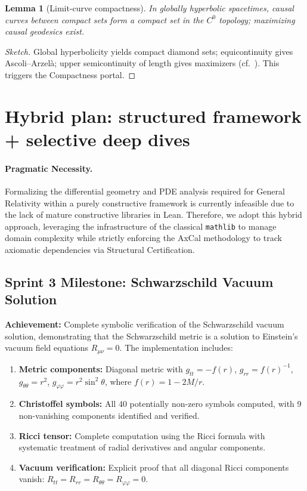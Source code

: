 \documentclass[11pt]{article}
\newtheorem{lemma}[theorem]{Lemma}
\theoremstyle{definition}
\theoremstyle{remark}
\begin{document}
\begin{lemma}[Limit-curve compactness]\label{lem:limitcurve}
In globally hyperbolic spacetimes, causal curves between compact sets form a compact set in the $C^0$ topology; maximizing causal geodesics exist.
\end{lemma}
\begin{proof}[Sketch]
Global hyperbolicity yields compact diamond sets; equicontinuity gives Ascoli--Arzelà; upper semicontinuity of length gives maximizers (cf.\ \cite[§14]{Wald1984}). This triggers the Compactness portal.
\end{proof}

\section{Hybrid plan: structured framework + selective deep dives}

\paragraph{Pragmatic Necessity.} Formalizing the differential geometry and PDE analysis required for General Relativity within a purely constructive framework is currently infeasible due to the lack of mature constructive libraries in Lean. Therefore, we adopt this hybrid approach, leveraging the infrastructure of the classical \texttt{mathlib} to manage domain complexity while strictly enforcing the AxCal methodology to track axiomatic dependencies via Structural Certification.

\subsection{Sprint 3 Milestone: Schwarzschild Vacuum Solution}
\textbf{Achievement:} Complete symbolic verification of the Schwarzschild vacuum solution, demonstrating that the Schwarzschild metric is a solution to Einstein's vacuum field equations $R_{\mu\nu} = 0$. The implementation includes:
\begin{enumerate}
\item \textbf{Metric components:} Diagonal metric with $g_{tt} = -f(r)$, $g_{rr} = f(r)^{-1}$, $g_{\theta\theta} = r^2$, $g_{\varphi\varphi} = r^2\sin^2\theta$, where $f(r) = 1 - 2M/r$.
\item \textbf{Christoffel symbols:} All 40 potentially non-zero symbols computed, with 9 non-vanishing components identified and verified.
\item \textbf{Ricci tensor:} Complete computation using the Ricci formula with systematic treatment of radial derivatives and angular components.
\item \textbf{Vacuum verification:} Explicit proof that all diagonal Ricci components vanish: $R_{tt} = R_{rr} = R_{\theta\theta} = R_{\varphi\varphi} = 0$.
\end{enumerate}
\end{document}
